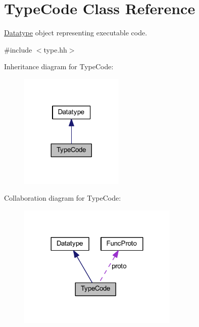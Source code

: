 \hypertarget{class_type_code}{}\section{Type\+Code Class Reference}
\label{class_type_code}


\mbox{\hyperlink{class_datatype}{Datatype}} object representing executable code.  




{\ttfamily \#include $<$type.\+hh$>$}



Inheritance diagram for Type\+Code\+:
\nopagebreak
\begin{figure}[H]
\begin{center}
\leavevmode
\includegraphics[width=140pt]{class_type_code__inherit__graph}
\end{center}
\end{figure}


Collaboration diagram for Type\+Code\+:
\nopagebreak
\begin{figure}[H]
\begin{center}
\leavevmode
\includegraphics[width=216pt]{class_type_code__coll__graph}
\end{center}
\end{figure}
